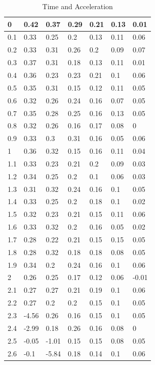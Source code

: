 \documentclass{article}
\begin{document}
 	\begin{table}[!ht]
 		\centering
 		\begin{tabular}{|l|l|l|l|l|l|l|}
 			\hline
 			0 & 0.42 & 0.37 & 0.29 & 0.21 & 0.13 & 0.01 \\ \hline
 			0.1 & 0.33 & 0.25 & 0.2 & 0.13 & 0.11 & 0.06 \\ \hline
 			0.2 & 0.33 & 0.31 & 0.26 & 0.2 & 0.09 & 0.07 \\ \hline
 			0.3 & 0.37 & 0.31 & 0.18 & 0.13 & 0.11 & 0.01 \\ \hline
 			0.4 & 0.36 & 0.23 & 0.23 & 0.21 & 0.1 & 0.06 \\ \hline
 			0.5 & 0.35 & 0.31 & 0.15 & 0.12 & 0.11 & 0.05 \\ \hline
 			0.6 & 0.32 & 0.26 & 0.24 & 0.16 & 0.07 & 0.05 \\ \hline
 			0.7 & 0.35 & 0.28 & 0.25 & 0.16 & 0.13 & 0.05 \\ \hline
 			0.8 & 0.32 & 0.26 & 0.16 & 0.17 & 0.08 & 0 \\ \hline
 			0.9 & 0.33 & 0.3 & 0.31 & 0.16 & 0.05 & 0.06 \\ \hline
 			1 & 0.36 & 0.32 & 0.15 & 0.16 & 0.11 & 0.04 \\ \hline
 			1.1 & 0.33 & 0.23 & 0.21 & 0.2 & 0.09 & 0.03 \\ \hline
 			1.2 & 0.34 & 0.25 & 0.2 & 0.1 & 0.06 & 0.03 \\ \hline
 			1.3 & 0.31 & 0.32 & 0.24 & 0.16 & 0.1 & 0.05 \\ \hline
 			1.4 & 0.33 & 0.25 & 0.2 & 0.18 & 0.1 & 0.02 \\ \hline
 			1.5 & 0.32 & 0.23 & 0.21 & 0.15 & 0.11 & 0.06 \\ \hline
 			1.6 & 0.33 & 0.32 & 0.2 & 0.16 & 0.05 & 0.02 \\ \hline
 			1.7 & 0.28 & 0.22 & 0.21 & 0.15 & 0.15 & 0.05 \\ \hline
 			1.8 & 0.28 & 0.32 & 0.18 & 0.18 & 0.08 & 0.05 \\ \hline
 			1.9 & 0.34 & 0.2 & 0.24 & 0.16 & 0.1 & 0.06 \\ \hline
 			2 & 0.26 & 0.25 & 0.17 & 0.12 & 0.06 & -0.01 \\ \hline
 			2.1 & 0.27 & 0.27 & 0.21 & 0.19 & 0.1 & 0.06 \\ \hline
 			2.2 & 0.27 & 0.2 & 0.2 & 0.15 & 0.1 & 0.05 \\ \hline
 			2.3 & -4.56 & 0.26 & 0.16 & 0.15 & 0.1 & 0.05 \\ \hline
 			2.4 & -2.99 & 0.18 & 0.26 & 0.16 & 0.08 & 0 \\ \hline
 			2.5 & -0.05 & -1.01 & 0.15 & 0.15 & 0.08 & 0.05 \\ \hline
 			2.6 & -0.1 & -5.84 & 0.18 & 0.14 & 0.1 & 0.06 \\ \hline
 		\end{tabular}
 		\caption{Time and Acceleration}
 		\label{acctime}
 	\end{table}
 
\end{document}
